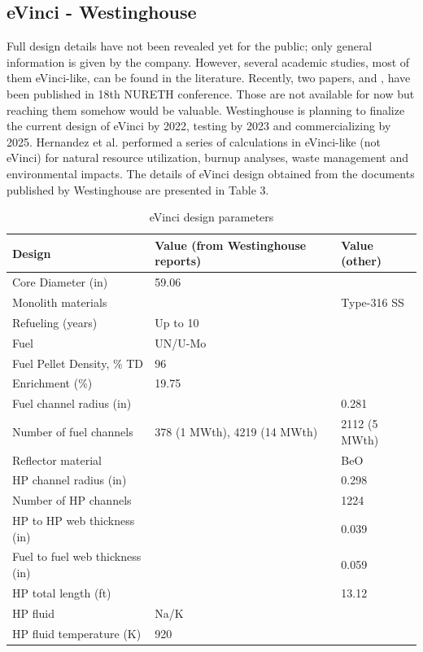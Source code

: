 \documentclass[10pt,a4paper]{article}
\begin{document}
\subsection{eVinci - Westinghouse}
Full design details have not been revealed yet for the public; only general information is given by the company. However, several academic studies, most of them eVinci-like, can be found in the literature. Recently, two papers, \cite{Xu19} and \cite{Wright19}, have been published in 18th NURETH conference. Those are not available for now but reaching them somehow would be valuable. Westinghouse is planning to finalize the current design of eVinci by 2022, testing by 2023 and commercializing by 2025. Hernandez et al. \cite{Hernandez19} performed a series of calculations in eVinci-like (not eVinci) for natural resource utilization, burnup analyses, waste management and environmental impacts. The details of eVinci design obtained from the documents published by Westinghouse are presented in Table 3. 

\begin{table} [ht]
\begin{center}

\caption{eVinci design parameters}
\begin{tabular}{l  l  l}
\hline
Design 		&Value (from Westinghouse reports) 		& Value (other)\\ 
\hline
Core Diameter (in) 		&59.06 		&  \\ 
Monolith materials 		& 		& Type-316 SS	\\ 
Refueling (years) 		&Up to 10 		&  \\ 
Fuel 		&UN/U-Mo 		& 	 \\ 
Fuel Pellet Density, \% TD 		&96 		&  \\ 
Enrichment (\%) 		&19.75 		&  \\ 
Fuel channel radius (in) 		& 		& 0.281 \\ 
Number of fuel channels 		&378 (1 MWth), 4219 (14 MWth)		& 2112 (5 MWth) \\ 
Reflector material 		&		& BeO\\ 
HP channel radius (in) 		&		& 0.298\\ 
Number of HP channels 		& 		& 1224\\ 
HP to HP web thickness (in) 		& 		& 0.039\\ 
Fuel to fuel web thickness (in) 		& 		& 0.059\\ 
HP total length (ft) 		&		& 13.12\\ 
HP fluid 		&Na/K		& \\ 
HP fluid temperature (K) 		&920 		& \\ 
\hline

\end{tabular}
\end{center}
\end{table}
\end{document}
